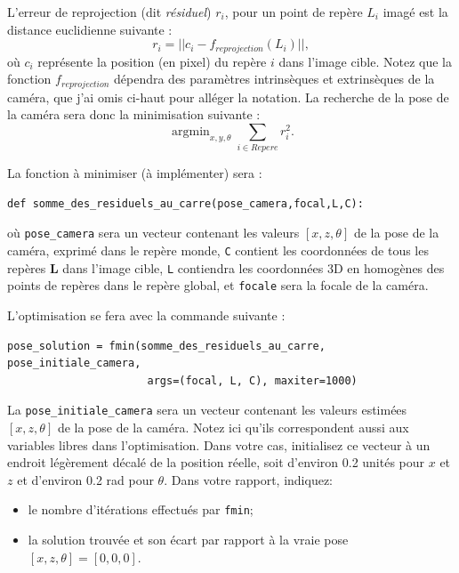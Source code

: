 \documentclass[12pt]{article}
\DeclareMathOperator*{\argmin}{argmin} %
\begin{document}
L'erreur de reprojection (dit \emph{résiduel}) $r_i$, pour un point de repère $L_i$ imagé est la distance euclidienne suivante :
\begin{equation}
r_i= || c_i-f_{reprojection}(L_i)||,
\end{equation}
où $c_i$ représente la position (en pixel) du repère $i$ dans l'image cible. Notez que la fonction $f_{reprojection}$ dépendra des paramètres intrinsèques et extrinsèques de la caméra, que j'ai omis ci-haut pour alléger la notation.
La recherche de la pose de la caméra sera donc la minimisation suivante :
\begin{equation}
    \argmin_{x,y,\theta} \sum_{i \in Repere} r_i^2.
\end{equation}



La fonction à minimiser (à implémenter) sera :
\begin{verbatim}
def somme_des_residuels_au_carre(pose_camera,focal,L,C):
\end{verbatim}
où \texttt{pose\_camera} sera un vecteur contenant les valeurs $[x,z,\theta]$ de la pose de la caméra, exprimé dans le repère monde,
\texttt{C} contient les coordonnées de tous les repères $\mathbf{L}$ dans l'image cible, \texttt{L} contiendra les coordonnées 3D en homogènes des points de repères dans le repère global, et \texttt{focale} sera la focale de la caméra.

L'optimisation se fera avec la commande suivante :
\begin{verbatim}
pose_solution = fmin(somme_des_residuels_au_carre, pose_initiale_camera, 
                      args=(focal, L, C), maxiter=1000)
\end{verbatim}
La \texttt{pose\_initiale\_camera} sera un vecteur contenant les valeurs estimées $[x,z,\theta]$ de la pose de la caméra. Notez ici qu'ils correspondent aussi aux variables libres dans l'optimisation. Dans votre cas, initialisez ce vecteur à un endroit légèrement décalé de la position réelle, soit d'environ 0.2 unités pour $x$ et $z$ et d'environ 0.2 rad pour $\theta$.
Dans votre rapport, indiquez:
\begin{itemize}
    \item le nombre d'itérations effectués par \texttt{fmin};
    \item la solution trouvée et son écart par rapport à la vraie pose $[x,z,\theta]= [0, 0, 0] $.
\end{itemize}
\end{document}

